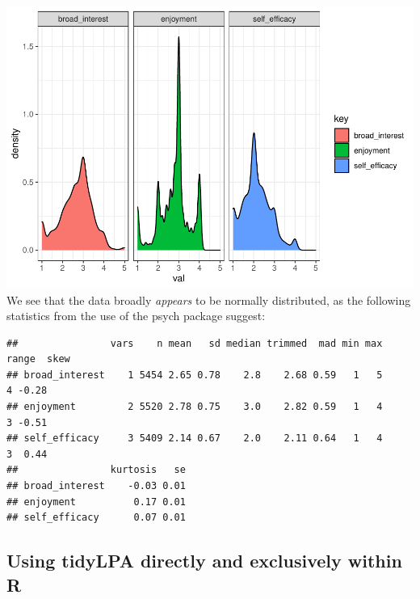\documentclass[man]{apa6}
\newenvironment{Shaded}{\begin{snugshade}}{\end{snugshade}}
\newcommand{\KeywordTok}[1]{\textcolor[rgb]{0.13,0.29,0.53}{\textbf{#1}}}
\newcommand{\NormalTok}[1]{#1}
\newcommand{\OperatorTok}[1]{\textcolor[rgb]{0.81,0.36,0.00}{\textbf{#1}}}
\newcommand{\StringTok}[1]{\textcolor[rgb]{0.31,0.60,0.02}{#1}}
\begin{document}
\includegraphics{paper_files/figure-latex/unnamed-chunk-6-1.pdf}
We see that the data broadly \emph{appears} to be normally distributed, as the following statistics from the use of the psych package suggest:

\begin{Shaded}
\end{Shaded}

\begin{verbatim}
##                vars    n mean   sd median trimmed  mad min max range  skew
## broad_interest    1 5454 2.65 0.78    2.8    2.68 0.59   1   5     4 -0.28
## enjoyment         2 5520 2.78 0.75    3.0    2.82 0.59   1   4     3 -0.51
## self_efficacy     3 5409 2.14 0.67    2.0    2.11 0.64   1   4     3  0.44
##                kurtosis   se
## broad_interest    -0.03 0.01
## enjoyment          0.17 0.01
## self_efficacy      0.07 0.01
\end{verbatim}

\hypertarget{using-tidylpa-directly-and-exclusively-within-r}{%
\subsection{Using tidyLPA directly and exclusively within R}\label{using-tidylpa-directly-and-exclusively-within-r}}
\end{document}

